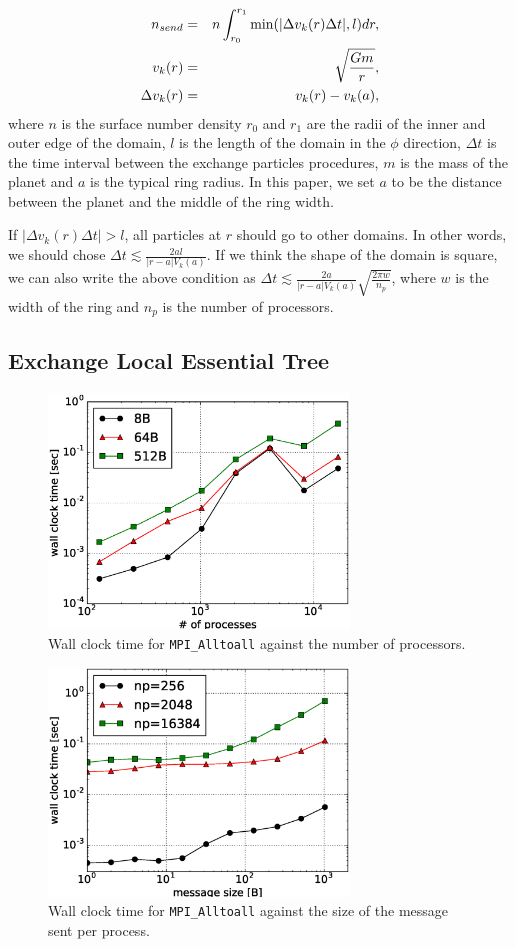 \documentclass[oribibl]{llncs}
\begin{document}
\begin{eqnarray}
  n_{send} &=& n\int_{r_0}^{r_1} {\rm min}(|\Delta v_k(r) \Delta t|, l) dr, \\
  v_k(r) &=& \sqrt{\frac{Gm}{r}}, \\
  \Delta v_k(r) &=& v_k(r) - v_k(a),
\end{eqnarray}
where $n$ is the surface number density $r_0$ and $r_1$ are the radii
of the inner and outer edge of the domain, $l$ is the length of the
domain in the $\phi$ direction, $\Delta t$ is the time interval
between the exchange particles procedures, $m$ is the mass of the
planet and $a$ is the typical ring radius. In this paper, we set $a$
to be the distance between the planet and the middle of the ring
width.

If $|\Delta v_k(r) \Delta t| > l$, all particles at $r$ should go to
other domains. In other words, we should chose $\Delta t \lesssim
\frac{2al}{|r-a| V_k(a)}$. If we think the shape of the domain is
square, we can also write the above condition as $\Delta t \lesssim
\frac{2a}{|r-a| V_k(a)}\sqrt{\frac{2\pi w}{n_p}}$, where $w$ is the
width of the ring and $n_p$ is the number of processors.

\subsection{Exchange Local Essential Tree}
\label{subsec:exlet}

\begin{figure}
  \centering \includegraphics[width=8cm,clip]{./fig/comm_np-wtime.eps}
  \caption{Wall clock time for {\tt MPI\_Alltoall} against the number of processors.}
  \label{fig:comm_np-wtime}
\end{figure}

\begin{figure}
  \centering
  \includegraphics[width=8cm,clip]{./fig/comm_msize-wtime.eps}
  \caption{Wall clock time for {\tt MPI\_Alltoall} against the size of the message sent per process.}
  \label{fig:comm_msize-wtime}
\end{figure}
\end{document}
